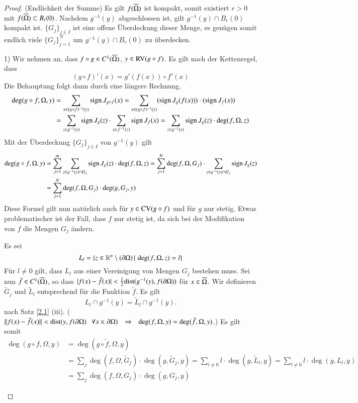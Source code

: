 \begin{proof}
    (Endlichkeit der Summe) Es gilt $f(\overline\Omega)$ ist kompakt, somit existiert $r>0$ mit $f(\overline \Omega)
    \subset B_r(0)$. Nachdem $g^{-1}(y)$ abgeschlossen ist, gilt $g^{-1}(y)\cap B_r(0)$ kompakt ist.
    $\{G_j\}_{j\in I}$ ist eine offene Überdeckung dieser Menge, es genügen somit endlich viele $\{  
    G_j \}_{j=1}^N$ um $g^{-1}(y)\cap B_r(0)$ zu überdecken.
    \begin{description}
    \item{1)}
    Wir nehmen an, dass $f\circ g\in C^1(\overline \Omega)$, $y\in \mathrm{RV}(g\circ f)$. Es gilt nach der
    Kettenregel, dass
    \[
        (g\circ f)'(x)=g'(f(x))\circ f'(x)
    \]
    Die Behauptung folgt dann durch eine längere Rechnung.
    \begin{align*}
        \deg(g\circ f,\Omega,y)&=\sum_{x\in(g\circ f)^{-1}(y)}\mathrm{sign}\, J_{g\circ f}(x)=\sum_{x\in (g\circ f)
        ^{-1} (y)}(\mathrm{sign}\, J_g(f(x)))\cdot(\mathrm{sign}\, J_f(x))\\
        &= \sum_{z\in g^{-1}(y)} \mathrm{sign}\, J_g(z)\cdot \sum_{x\in f^{-1}(z)} \mathrm{sign}\, J_f(x)
        =\sum_{z\in g^{-1}(y)} \mathrm{sign}\, J_g(z)\cdot \deg(f,\Omega,z)
    \end{align*}
    Mit der Überdeckung $\{G_j\}_{j\in I}$ von $g^{-1}(y)$ gilt
    \begin{align*}
        \deg(g\circ f,\Omega,y)&=\sum_{j=1}^m\sum_{z\in g^{-1}(y)\cap G_j}\mathrm{sign}\, J_g(z)\cdot \deg(f,\Omega,z)
        =\sum_{j=1}^N \deg(f,\Omega,G_j) \cdot \sum_{z\in g^{-1}(y)\cap G_j} \mathrm{sign}\, J_g(z)\\
        &= \sum_{j=1}^N \deg(f,\Omega,G_j)\cdot \deg(g,G_j,y)
    \end{align*}
    Diese Formel gilt nun natürlich auch für $y\in \mathrm{CV}(g\circ f)$ und für $g$ nur stetig. Etwas
    problematischer ist der Fall, dass $f$ nur stetig ist, da sich bei der Modifikation von $f$ die
    Mengen $G_j$ ändern.

    Es sei
    \[
        L_l=\{z\in \mathbb{R}^n\setminus(\partial \Omega)\, | \, \deg(f,\Omega,z)=l\}
    \]
    Für $l\neq 0$ gilt, dass $L_l$ aus einer Vereinigung von Mengen $G_j$ bestehen muss. Sei nun
    $\tilde f\in C^1 (\overline \Omega)$, so dass $|f(x)-\tilde f(x)|< \frac 12 \mathrm{dist}(g^{-1}(y),
    f(\partial\Omega))$ für $x\in \overline \Omega$. Wir definieren $\tilde G_j$ und $\tilde L_l$ entsprechend
    für die Funktion $\tilde f$.
    Es gilt
    \[
        L_l\cap g^{-1}(y)=\tilde L_l\cap g^{-1}(y).
    \]
    nach Satz \ref{2.1} (iii). ($\|f(x)-\tilde f(x)\|<\mathrm{dist}(y,f(\partial \Omega)\hspace{.25cm} \forall
    x\in \partial \Omega)\hspace{.25cm} \Rightarrow \hspace{.25cm} \deg(f,\Omega,y)=\deg(\tilde f,\Omega,y)$.) Es gilt somit
    \begin{align*}
        \deg(g\circ f, \Omega, y)&=\deg(g\circ\tilde f,\Omega,y)\\
        &=\sum_{j}\deg(f,\Omega,\tilde G_j)\cdot \deg(g,\tilde G_j,y)=\sum_{l\neq0} l\cdot\deg( g,\tilde
        L_l,y)=\sum_{l\neq 0} l\cdot \deg(g,L_l,y)\\
        &=\sum_j \deg(f,\Omega,G_j)\cdot \deg(g,G_j,y)
    \end{align*}
    \end{description}
    \[ \]
\end{proof}

